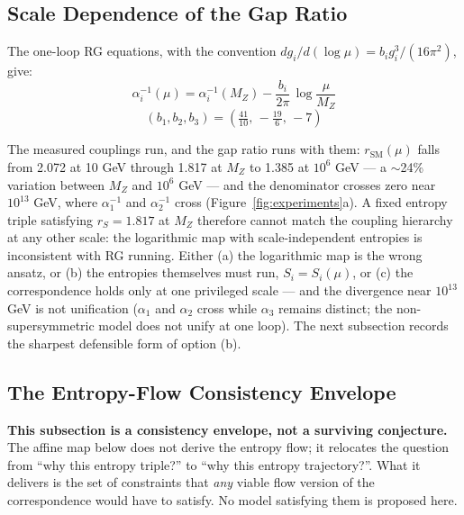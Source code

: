 \documentclass[11pt]{article}
\newcommand{\rSM}{r_{\mathrm{SM}}}
\begin{document}
\subsection{Scale Dependence of the Gap Ratio}
\label{sec:running}

The one-loop RG equations, with the convention $dg_i/d(\log\mu) = b_i g_i^3/(16\pi^2)$, give:
\begin{equation}
\alpha_i^{-1}(\mu) = \alpha_i^{-1}(M_Z) - \frac{b_i}{2\pi}\,\log\frac{\mu}{M_Z}
\label{eq:running}
\end{equation}
\[
(b_1, b_2, b_3) = \left(\tfrac{41}{10},\, -\tfrac{19}{6},\, -7\right)
\]

The measured couplings run, and the gap ratio runs with them: $\rSM(\mu)$ falls from 2.072 at 10 GeV through 1.817 at $M_Z$ to 1.385 at $10^6$ GeV --- a $\sim$24\% variation between $M_Z$ and $10^6$ GeV --- and the denominator crosses zero near $10^{13}$ GeV, where $\alpha_1^{-1}$ and $\alpha_2^{-1}$ cross (Figure~\ref{fig:experiments}a). A fixed entropy triple satisfying $r_S = 1.817$ at $M_Z$ therefore cannot match the coupling hierarchy at any other scale: the logarithmic map with scale-independent entropies is inconsistent with RG running. Either (a) the logarithmic map is the wrong ansatz, or (b) the entropies themselves must run, $S_i = S_i(\mu)$, or (c) the correspondence holds only at one privileged scale --- and the divergence near $10^{13}$ GeV is not unification ($\alpha_1$ and $\alpha_2$ cross while $\alpha_3$ remains distinct; the non-supersymmetric model does not unify at one loop). The next subsection records the sharpest defensible form of option (b).

\subsection{The Entropy-Flow Consistency Envelope}
\label{sec:envelope}

\textbf{This subsection is a consistency envelope, not a surviving conjecture.} The affine map below does not derive the entropy flow; it relocates the question from ``why this entropy triple?'' to ``why this entropy trajectory?''. What it delivers is the set of constraints that \emph{any} viable flow version of the correspondence would have to satisfy. No model satisfying them is proposed here.
\end{document}
